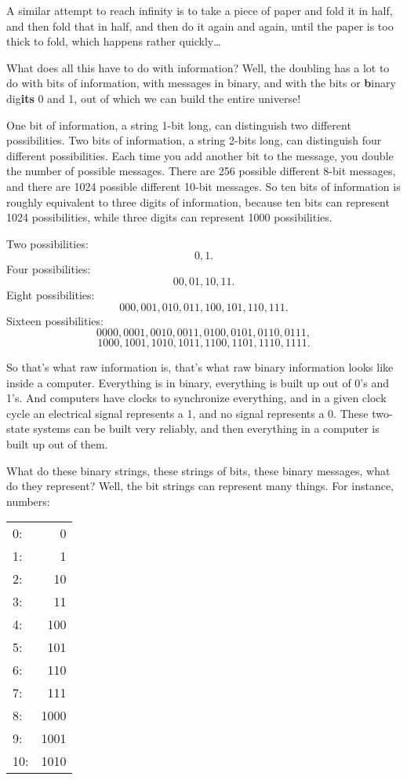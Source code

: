 \documentclass[12pt]{book}
\begin{document}
A similar attempt to reach infinity is to take a piece of paper and fold it in half, and
then fold that in half, and then do it again and again, until the paper is too thick to
fold, which happens rather quickly\ldots
 
What does all this have to do with information? 
Well, the doubling has a lot to do with bits of information, with messages in binary,
and with the bits or \textbf{b}inary dig\textbf{its} 0 and 1, 
out of which we can build the entire universe!
 
One bit of information, a string 1-bit long, can distinguish two different possibilities.
Two bits of information, a string 2-bits long, can distinguish four different possibilities.
Each time you add another bit to the message, you double the number of possible messages.
There are 256 possible different 8-bit messages, 
and there are 1024 possible different 10-bit messages.
So ten bits of information is roughly equivalent to three digits of information,
because ten bits can represent 1024 possibilities, while three digits can represent 1000 possibilities.
 
Two possibilities:
\[
0, 1.
\]
Four possibilities:
\[
00, 01, 10, 11.
\]
Eight possibilities:
\[
000, 001, 010, 011, 100, 101, 110, 111.
\]
Sixteen possibilities:
\[
0000, 0001, 0010, 0011, 0100, 0101, 0110, 0111,
\]
\[
1000, 1001, 1010, 1011, 1100, 1101, 1110, 1111.
\]
 
So that's what raw information is, that's what raw binary information looks like inside a computer.
Everything is in binary, everything is built up out of 0's and 1's.
And computers have clocks to synchronize everything, and in a given clock cycle an
electrical signal represents a 1, and no signal represents a 0.  These two-state systems
can be built very reliably, and then everything in a computer is built up out of them.
 
What do these binary strings, these strings of bits, these binary messages, what do they
represent?  Well, the bit strings can represent many things. For instance, numbers:
\begin{center}
\begin{tabular}{lr}
0: & 0 \\
1: & 1 \\
2: & 10 \\
3: & 11 \\
4: & 100 \\
5: & 101 \\
6: & 110 \\
7: & 111 \\
8: & 1000 \\
9: & 1001 \\
10: & 1010
\end{tabular}
\end{center}
 
\end{document}
